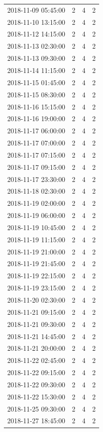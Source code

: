 \begin{tabular}{lrrr}
2018-11-09 05:45:00 & 2 & 4 & 2 \\
2018-11-10 13:15:00 & 2 & 4 & 2 \\
2018-11-12 14:15:00 & 2 & 4 & 2 \\
2018-11-13 02:30:00 & 2 & 4 & 2 \\
2018-11-13 09:30:00 & 2 & 4 & 2 \\
2018-11-14 11:15:00 & 2 & 4 & 2 \\
2018-11-15 01:45:00 & 2 & 4 & 2 \\
2018-11-15 08:30:00 & 2 & 4 & 2 \\
2018-11-16 15:15:00 & 2 & 4 & 2 \\
2018-11-16 19:00:00 & 2 & 4 & 2 \\
2018-11-17 06:00:00 & 2 & 4 & 2 \\
2018-11-17 07:00:00 & 2 & 4 & 2 \\
2018-11-17 07:15:00 & 2 & 4 & 2 \\
2018-11-17 09:15:00 & 2 & 4 & 2 \\
2018-11-17 23:30:00 & 2 & 4 & 2 \\
2018-11-18 02:30:00 & 2 & 4 & 2 \\
2018-11-19 02:00:00 & 2 & 4 & 2 \\
2018-11-19 06:00:00 & 2 & 4 & 2 \\
2018-11-19 10:45:00 & 2 & 4 & 2 \\
2018-11-19 11:15:00 & 2 & 4 & 2 \\
2018-11-19 21:00:00 & 2 & 4 & 2 \\
2018-11-19 21:45:00 & 2 & 4 & 2 \\
2018-11-19 22:15:00 & 2 & 4 & 2 \\
2018-11-19 23:15:00 & 2 & 4 & 2 \\
2018-11-20 02:30:00 & 2 & 4 & 2 \\
2018-11-21 09:15:00 & 2 & 4 & 2 \\
2018-11-21 09:30:00 & 2 & 4 & 2 \\
2018-11-21 14:45:00 & 2 & 4 & 2 \\
2018-11-21 20:00:00 & 2 & 4 & 2 \\
2018-11-22 02:45:00 & 2 & 4 & 2 \\
2018-11-22 09:15:00 & 2 & 4 & 2 \\
2018-11-22 09:30:00 & 2 & 4 & 2 \\
2018-11-22 15:30:00 & 2 & 4 & 2 \\
2018-11-25 09:30:00 & 2 & 4 & 2 \\
2018-11-27 18:45:00 & 2 & 4 & 2 \\

\end{tabular}
